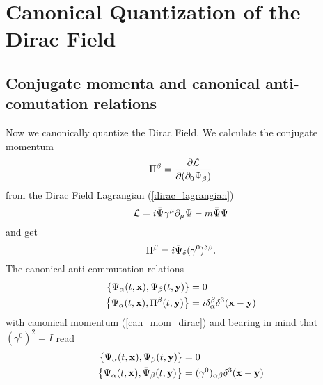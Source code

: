 \chapter{Canonical Quantization of the Dirac Field}
\section{Conjugate momenta and canonical anti-comutation relations}
Now we canonically quantize the Dirac Field. We calculate the conjugate momentum
\begin{equation}
    \Pi^\beta=\pdv{\mathcal{L}}{(\partial_0\Psi_\beta)}
\end{equation}
from the Dirac Field Lagrangian (\ref{dirac_lagrangian}) $$\mathcal{L}=i\Bar{\Psi}\gamma^\mu\partial_\mu\Psi-m\Bar{\Psi}\Psi$$
and get
\begin{equation}
    \Pi^\beta=i\Bar{\Psi}_\delta(\gamma^0)^{\delta\beta}.
    \label{can_mom_dirac}
\end{equation}
The canonical anti-commutation relations 
\begin{equation*}
    \begin{aligned}
        \pb{\Psi_\alpha(t,\vb{x})}{\Psi_\beta(t,\vb{y})}&=0\\
        \pb{\Psi_\alpha(t,\vb{x})}{\Pi^\beta(t,\vb{y})}&=i\delta_\alpha^\beta\delta^3(\vb{x}-\vb{y})
    \end{aligned}
\end{equation*}
with canonical momentum (\ref{can_mom_dirac}) and bearing in mind that $(\gamma^0)^2=I$ read
\begin{equation}
    \begin{aligned}
        \pb{\Psi_\alpha(t,\vb{x})}{\Psi_\beta(t,\vb{y})}&=0\\
        \pb{\Psi_\alpha(t,\vb{x})}{\Bar{\Psi}_\beta(t,\vb{y})}&=(\gamma^0)_{\alpha\beta}\delta^3(\vb{x}-\vb{y})
    \end{aligned}
    \label{anticomm_dirac}
\end{equation}
